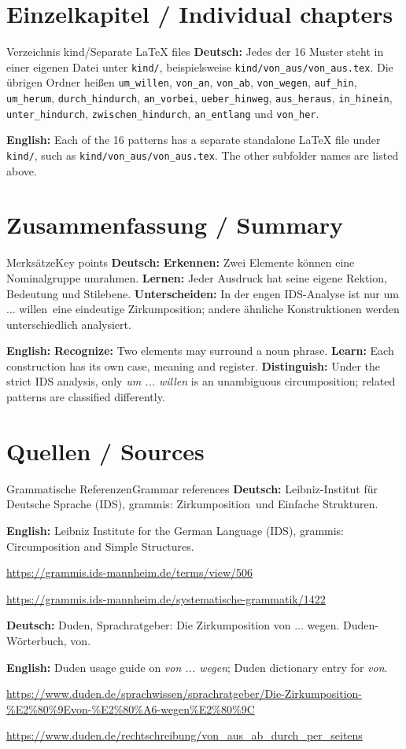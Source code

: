 \documentclass[a4paper,11pt]{article}
\newcommand{\GermanText}[1]{\textbf{Deutsch: }#1\par}
\newcommand{\EnglishText}[1]{{\small\color{SoftGray}\textbf{English: }#1\par}}
\begin{document}
\section{Einzelkapitel / Individual chapters}
\begin{grammarentry}{Verzeichnis kind/}{Separate LaTeX files}
\GermanText{Jedes der 16 Muster steht in einer eigenen Datei unter \texttt{kind/}, beispielsweise \texttt{kind/von\_aus/von\_aus.tex}. Die übrigen Ordner heißen \texttt{um\_willen}, \texttt{von\_an}, \texttt{von\_ab}, \texttt{von\_wegen}, \texttt{auf\_hin}, \texttt{um\_herum}, \texttt{durch\_hindurch}, \texttt{an\_vorbei}, \texttt{ueber\_hinweg}, \texttt{aus\_heraus}, \texttt{in\_hinein}, \texttt{unter\_hindurch}, \texttt{zwischen\_hindurch}, \texttt{an\_entlang} und \texttt{von\_her}.}
\EnglishText{Each of the 16 patterns has a separate standalone LaTeX file under \texttt{kind/}, such as \texttt{kind/von\_aus/von\_aus.tex}. The other subfolder names are listed above.}
\end{grammarentry}

\section{Zusammenfassung / Summary}
\begin{grammarentry}{Merksätze}{Key points}
\GermanText{\textbf{Erkennen:} Zwei Elemente können eine Nominalgruppe umrahmen. \textbf{Lernen:} Jeder Ausdruck hat seine eigene Rektion, Bedeutung und Stilebene. \textbf{Unterscheiden:} In der engen IDS-Analyse ist nur \glqq um ... willen\grqq\ eine eindeutige Zirkumposition; andere ähnliche Konstruktionen werden unterschiedlich analysiert.}
\EnglishText{\textbf{Recognize:} Two elements may surround a noun phrase. \textbf{Learn:} Each construction has its own case, meaning and register. \textbf{Distinguish:} Under the strict IDS analysis, only \emph{um ... willen} is an unambiguous circumposition; related patterns are classified differently.}
\end{grammarentry}

\section{Quellen / Sources}
\begin{grammarentry}{Grammatische Referenzen}{Grammar references}
\GermanText{Leibniz-Institut für Deutsche Sprache (IDS), grammis: \glqq Zirkumposition\grqq\ und \glqq Einfache Strukturen\grqq.}
\EnglishText{Leibniz Institute for the German Language (IDS), grammis: Circumposition and Simple Structures.}
\url{https://grammis.ids-mannheim.de/terms/view/506}\par
\url{https://grammis.ids-mannheim.de/systematische-grammatik/1422}\par
\GermanText{Duden, Sprachratgeber: \glqq Die Zirkumposition von ... wegen\grqq. Duden-Wörterbuch, \glqq von\grqq.}
\EnglishText{Duden usage guide on \emph{von ... wegen}; Duden dictionary entry for \emph{von}.}
\url{https://www.duden.de/sprachwissen/sprachratgeber/Die-Zirkumposition-\%E2\%80\%9Evon-\%E2\%80\%A6-wegen\%E2\%80\%9C}\par
\url{https://www.duden.de/rechtschreibung/von_aus_ab_durch_per_seitens}
\end{grammarentry}
\end{document}
